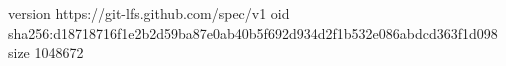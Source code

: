 version https://git-lfs.github.com/spec/v1
oid sha256:d18718716f1e2b2d59ba87e0ab40b5f692d934d2f1b532e086abdcd363f1d098
size 1048672
